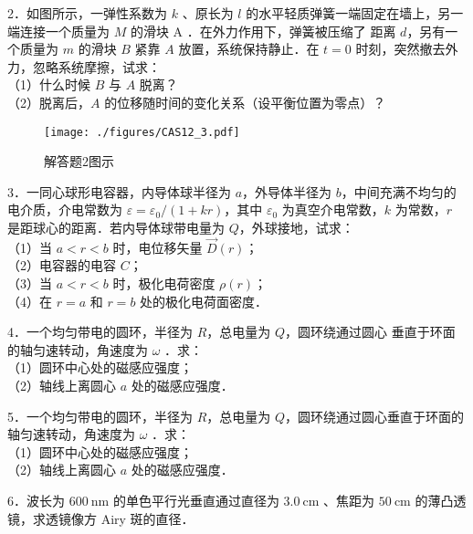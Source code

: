 2．如图所示，一弹性系数为 $k$ 、原长为 $l$ 的水平轻质弹簧一端固定在墙上，另一端连接一个质量为 $M$ 的滑块 $\mathrm{A}$ ．在外力作用下，弹簧被压缩了 距离 $d$，另有一个质量为 $m$ 的滑块 $B$ 紧靠 $A$ 放置，系统保持静止．在 $t=0$ 时刻，突然撤去外力，忽略系统摩擦，试求：\\
（1）什么时候 $B$ 与 $A$ 脱离？\\
（2）脱离后，$A$ 的位移随时间的变化关系（设平衡位置为零点）？
\begin{figure}[ht]
\centering
\texttt{[image: ./figures/CAS12\_3.pdf]}
\caption{解答题2图示} \label{CAS12_fig3}
\end{figure}
3．一同心球形电容器，内导体球半径为 $a$，外导体半径为 $b$，中间充满不均匀的电介质，介电常数为 $\varepsilon=\varepsilon_{0} /(1+k r)$，其中 $\varepsilon_{0}$ 为真空介电常数，$k$ 为常数，$r$ 是距球心的距离．若内导体球带电量为 $Q$，外球接地，试求：\\
（1）当 $a<r< b$ 时，电位移矢量 $\vec{D}(r)$；\\
（2）电容器的电容 $C$；\\
（3）当 $a<r< b$ 时，极化电荷密度 $\rho(r)$；\\
（4）在 $r=a$ 和 $r=b$ 处的极化电荷面密度．

4．一个均匀带电的圆环，半径为 $R$，总电量为 $Q$，圆环绕通过圆心
垂直于环面的轴匀速转动，角速度为 $\omega$ ．求：\\
（1）圆环中心处的磁感应强度；\\
（2）轴线上离圆心 $a$ 处的磁感应强度．

5．一个均匀带电的圆环，半径为 $R$，总电量为 $Q$，圆环绕通过圆心垂直于环面的轴匀速转动，角速度为 $\omega$ ．求：\\
（1）圆环中心处的磁感应强度；\\
（2）轴线上离圆心 $a$ 处的磁感应强度．

6．波长为 $600 \mathrm{~nm}$ 的单色平行光垂直通过直径为 $3.0 \mathrm{~cm}$ 、焦距为 $50 \mathrm{~cm}$ 的薄凸透镜，求透镜像方 Airy 斑的直径．